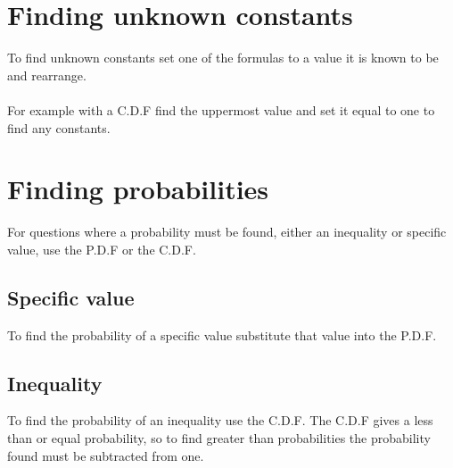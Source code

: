 \documentclass{article}[18pt]
\begin{document}
\section{Finding unknown constants}
To find unknown constants set one of the formulas to a value it is known to be and rearrange.\\
\\
For example with a C.D.F find the uppermost value and set it equal to one to find any constants.
\section{Finding probabilities}
For questions where a probability must be found, either an inequality or specific value, use the P.D.F or the C.D.F.
\subsection{Specific value}
To find the probability of a specific value substitute that value into the P.D.F.
\subsection{Inequality}
To find the probability of an inequality use the C.D.F. The C.D.F gives a less than or equal probability, so to find greater than probabilities the probability found must be subtracted from one.
\end{document}
